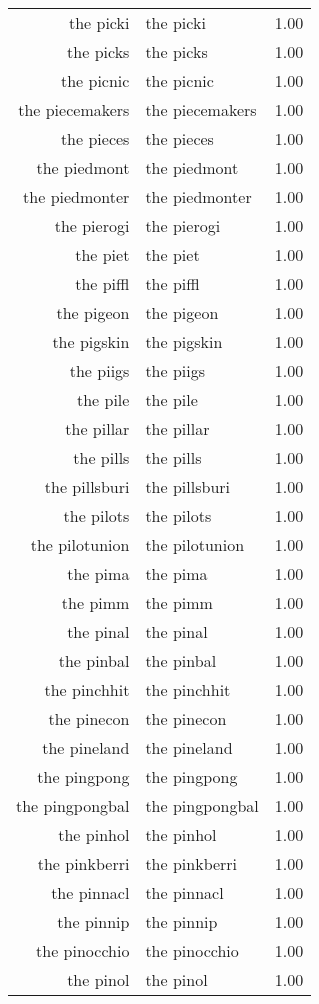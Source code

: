 \begin{table}[ht]
\begin{tabular}{rlr}
  the picki & the picki & 1.00 \\ 
  the picks & the picks & 1.00 \\ 
  the picnic & the picnic & 1.00 \\ 
  the piecemakers & the piecemakers & 1.00 \\ 
  the pieces & the pieces & 1.00 \\ 
  the piedmont & the piedmont & 1.00 \\ 
  the piedmonter & the piedmonter & 1.00 \\ 
  the pierogi & the pierogi & 1.00 \\ 
  the piet & the piet & 1.00 \\ 
  the piffl & the piffl & 1.00 \\ 
  the pigeon & the pigeon & 1.00 \\ 
  the pigskin & the pigskin & 1.00 \\ 
  the piigs & the piigs & 1.00 \\ 
  the pile & the pile & 1.00 \\ 
  the pillar & the pillar & 1.00 \\ 
  the pills & the pills & 1.00 \\ 
  the pillsburi & the pillsburi & 1.00 \\ 
  the pilots & the pilots & 1.00 \\ 
  the pilotunion & the pilotunion & 1.00 \\ 
  the pima & the pima & 1.00 \\ 
  the pimm & the pimm & 1.00 \\ 
  the pinal & the pinal & 1.00 \\ 
  the pinbal & the pinbal & 1.00 \\ 
  the pinchhit & the pinchhit & 1.00 \\ 
  the pinecon & the pinecon & 1.00 \\ 
  the pineland & the pineland & 1.00 \\ 
  the pingpong & the pingpong & 1.00 \\ 
  the pingpongbal & the pingpongbal & 1.00 \\ 
  the pinhol & the pinhol & 1.00 \\ 
  the pinkberri & the pinkberri & 1.00 \\ 
  the pinnacl & the pinnacl & 1.00 \\ 
  the pinnip & the pinnip & 1.00 \\ 
  the pinocchio & the pinocchio & 1.00 \\ 
  the pinol & the pinol & 1.00 \\ 

\end{tabular}
\end{table}
